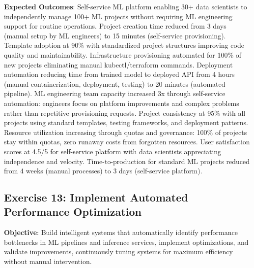 \textbf{Expected Outcomes}: Self-service ML platform enabling 30+ data scientists to independently manage 100+ ML projects without requiring ML engineering support for routine operations. Project creation time reduced from 3 days (manual setup by ML engineers) to 15 minutes (self-service provisioning). Template adoption at 90\% with standardized project structures improving code quality and maintainability. Infrastructure provisioning automated for 100\% of new projects eliminating manual kubectl/terraform commands. Deployment automation reducing time from trained model to deployed API from 4 hours (manual containerization, deployment, testing) to 20 minutes (automated pipeline). ML engineering team capacity increased 3x through self-service automation: engineers focus on platform improvements and complex problems rather than repetitive provisioning requests. Project consistency at 95\% with all projects using standard templates, testing frameworks, and deployment patterns. Resource utilization increasing through quotas and governance: 100\% of projects stay within quotas, zero runaway costs from forgotten resources. User satisfaction scores at 4.5/5 for self-service platform with data scientists appreciating independence and velocity. Time-to-production for standard ML projects reduced from 4 weeks (manual processes) to 3 days (self-service platform).

\subsection{Exercise 13: Implement Automated Performance Optimization}

\textbf{Objective}: Build intelligent systems that automatically identify performance bottlenecks in ML pipelines and inference services, implement optimizations, and validate improvements, continuously tuning systems for maximum efficiency without manual intervention.

